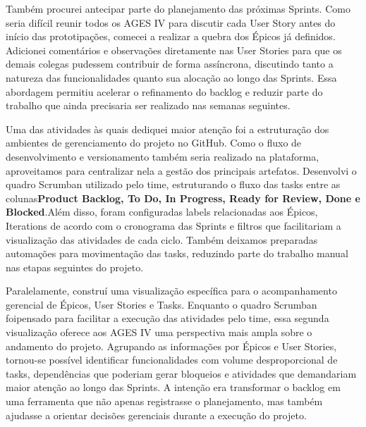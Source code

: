 \indent Também procurei antecipar parte do planejamento das próximas Sprints. Como seria difícil reunir todos os AGES IV para discutir cada User Story antes do início das prototipações, comecei a realizar a quebra dos Épicos já definidos. Adicionei comentários e observações diretamente nas User Stories para que os demais colegas pudessem contribuir de forma assíncrona, discutindo tanto a natureza das funcionalidades quanto sua alocação ao longo das Sprints. Essa abordagem permitiu acelerar o refinamento do backlog e reduzir parte do trabalho que ainda precisaria ser realizado nas semanas seguintes.\par

\indent Uma das atividades às quais dediquei maior atenção foi a estruturação dos ambientes de gerenciamento do projeto no GitHub. Como o fluxo de desenvolvimento e versionamento também seria realizado na plataforma, aproveitamos para centralizar nela a gestão dos principais artefatos. Desenvolvi o quadro Scrumban utilizado pelo time, estruturando o fluxo das tasks entre as colunas\originalspace{}\textbf{\textmd{Product Backlog, To Do, In Progress, Ready for Review, Done e Blocked}}.\originalspace{}Além disso, foram configuradas labels relacionadas aos Épicos, Iterations de acordo com o cronograma das Sprints e filtros que facilitariam a visualização das atividades de cada ciclo. Também deixamos preparadas automações para movimentação das tasks, reduzindo parte do trabalho manual nas etapas seguintes do projeto.\par


\indent Paralelamente, construí uma visualização específica para o acompanhamento gerencial de Épicos, User Stories e Tasks. Enquanto o quadro Scrumban foi\originalspace{}pensado para facilitar a execução das atividades pelo time, essa segunda visualização oferece aos AGES IV uma perspectiva mais ampla sobre o andamento do projeto. Agrupando as informações por Épicos e User Stories, tornou-se possível identificar funcionalidades com volume desproporcional de tasks, dependências que poderiam gerar bloqueios e atividades que demandariam maior atenção ao longo das Sprints. A intenção era transformar o backlog em uma ferramenta que não apenas registrasse o planejamento, mas também ajudasse a orientar decisões gerenciais durante a execução do projeto.\par


